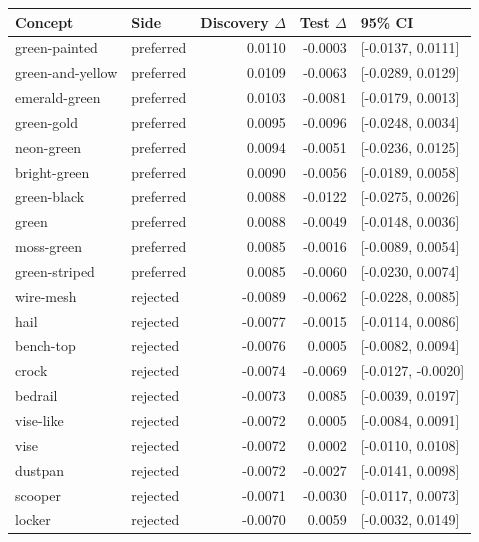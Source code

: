 \begin{tabular}{llrrl}
\toprule
Concept & Side & Discovery $\Delta$ & Test $\Delta$ & 95\% CI \\
\midrule
green-painted & preferred & 0.0110 & -0.0003 & [-0.0137, 0.0111] \\
green-and-yellow & preferred & 0.0109 & -0.0063 & [-0.0289, 0.0129] \\
emerald-green & preferred & 0.0103 & -0.0081 & [-0.0179, 0.0013] \\
green-gold & preferred & 0.0095 & -0.0096 & [-0.0248, 0.0034] \\
neon-green & preferred & 0.0094 & -0.0051 & [-0.0236, 0.0125] \\
bright-green & preferred & 0.0090 & -0.0056 & [-0.0189, 0.0058] \\
green-black & preferred & 0.0088 & -0.0122 & [-0.0275, 0.0026] \\
green & preferred & 0.0088 & -0.0049 & [-0.0148, 0.0036] \\
moss-green & preferred & 0.0085 & -0.0016 & [-0.0089, 0.0054] \\
green-striped & preferred & 0.0085 & -0.0060 & [-0.0230, 0.0074] \\
wire-mesh & rejected & -0.0089 & -0.0062 & [-0.0228, 0.0085] \\
hail & rejected & -0.0077 & -0.0015 & [-0.0114, 0.0086] \\
bench-top & rejected & -0.0076 & 0.0005 & [-0.0082, 0.0094] \\
crock & rejected & -0.0074 & -0.0069 & [-0.0127, -0.0020] \\
bedrail & rejected & -0.0073 & 0.0085 & [-0.0039, 0.0197] \\
vise-like & rejected & -0.0072 & 0.0005 & [-0.0084, 0.0091] \\
vise & rejected & -0.0072 & 0.0002 & [-0.0110, 0.0108] \\
dustpan & rejected & -0.0072 & -0.0027 & [-0.0141, 0.0098] \\
scooper & rejected & -0.0071 & -0.0030 & [-0.0117, 0.0073] \\
locker & rejected & -0.0070 & 0.0059 & [-0.0032, 0.0149] \\
\bottomrule
\end{tabular}
